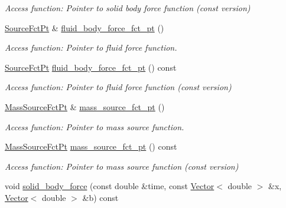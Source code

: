 \begin{DoxyCompactItemize}
\begin{DoxyCompactList}\small\item\em Access function\+: Pointer to solid body force function (const version) \end{DoxyCompactList}\item 
\hyperlink{classoomph_1_1AxisymmetricPoroelasticityEquations_a7a2c87557c3d9d405bb07a9f53bb4abe}{Source\+Fct\+Pt} \& \hyperlink{classoomph_1_1AxisymmetricPoroelasticityEquations_a966708620019a5a130e3c4a25dcb1fd9}{fluid\+\_\+body\+\_\+force\+\_\+fct\+\_\+pt} ()
\begin{DoxyCompactList}\small\item\em Access function\+: Pointer to fluid force function. \end{DoxyCompactList}\item 
\hyperlink{classoomph_1_1AxisymmetricPoroelasticityEquations_a7a2c87557c3d9d405bb07a9f53bb4abe}{Source\+Fct\+Pt} \hyperlink{classoomph_1_1AxisymmetricPoroelasticityEquations_ac07567747dcc36a11eab8f05487a76a4}{fluid\+\_\+body\+\_\+force\+\_\+fct\+\_\+pt} () const
\begin{DoxyCompactList}\small\item\em Access function\+: Pointer to fluid force function (const version) \end{DoxyCompactList}\item 
\hyperlink{classoomph_1_1AxisymmetricPoroelasticityEquations_a4f2fe2e03df9328898e9932b09299655}{Mass\+Source\+Fct\+Pt} \& \hyperlink{classoomph_1_1AxisymmetricPoroelasticityEquations_ac1f7b19af4a0aee7a81c1cec81e512e1}{mass\+\_\+source\+\_\+fct\+\_\+pt} ()
\begin{DoxyCompactList}\small\item\em Access function\+: Pointer to mass source function. \end{DoxyCompactList}\item 
\hyperlink{classoomph_1_1AxisymmetricPoroelasticityEquations_a4f2fe2e03df9328898e9932b09299655}{Mass\+Source\+Fct\+Pt} \hyperlink{classoomph_1_1AxisymmetricPoroelasticityEquations_a65c93799b24135cc865f9c0ec8aec9a0}{mass\+\_\+source\+\_\+fct\+\_\+pt} () const
\begin{DoxyCompactList}\small\item\em Access function\+: Pointer to mass source function (const version) \end{DoxyCompactList}\item 
void \hyperlink{classoomph_1_1AxisymmetricPoroelasticityEquations_ad60f7eabcd487ef2b2a6bb00561993bb}{solid\+\_\+body\+\_\+force} (const double \&time, const \hyperlink{classoomph_1_1Vector}{Vector}$<$ double $>$ \&x, \hyperlink{classoomph_1_1Vector}{Vector}$<$ double $>$ \&b) const

\end{DoxyCompactItemize}
